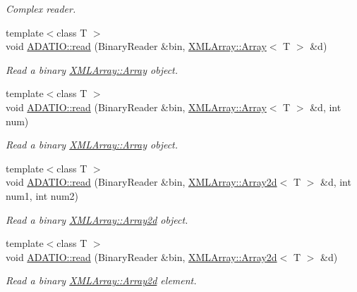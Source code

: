 \begin{DoxyCompactItemize}
\begin{DoxyCompactList}\small\item\em Complex reader. \end{DoxyCompactList}\item 
{\footnotesize template$<$class T $>$ }\\void \mbox{\hyperlink{namespaceADATIO_a16a912dec3b1d1424a44c9f1a6cd915f}{A\+D\+A\+T\+I\+O\+::read}} (Binary\+Reader \&bin, \mbox{\hyperlink{classXMLArray_1_1Array}{X\+M\+L\+Array\+::\+Array}}$<$ T $>$ \&d)
\begin{DoxyCompactList}\small\item\em Read a binary \mbox{\hyperlink{classXMLArray_1_1Array}{X\+M\+L\+Array\+::\+Array}} object. \end{DoxyCompactList}\item 
{\footnotesize template$<$class T $>$ }\\void \mbox{\hyperlink{namespaceADATIO_a2a2a1e3d909d72f5e64dcded1bdb8012}{A\+D\+A\+T\+I\+O\+::read}} (Binary\+Reader \&bin, \mbox{\hyperlink{classXMLArray_1_1Array}{X\+M\+L\+Array\+::\+Array}}$<$ T $>$ \&d, int num)
\begin{DoxyCompactList}\small\item\em Read a binary \mbox{\hyperlink{classXMLArray_1_1Array}{X\+M\+L\+Array\+::\+Array}} object. \end{DoxyCompactList}\item 
{\footnotesize template$<$class T $>$ }\\void \mbox{\hyperlink{namespaceADATIO_ab767ead2d172e8ecf85663edea909002}{A\+D\+A\+T\+I\+O\+::read}} (Binary\+Reader \&bin, \mbox{\hyperlink{classXMLArray_1_1Array2d}{X\+M\+L\+Array\+::\+Array2d}}$<$ T $>$ \&d, int num1, int num2)
\begin{DoxyCompactList}\small\item\em Read a binary \mbox{\hyperlink{classXMLArray_1_1Array2d}{X\+M\+L\+Array\+::\+Array2d}} object. \end{DoxyCompactList}\item 
{\footnotesize template$<$class T $>$ }\\void \mbox{\hyperlink{namespaceADATIO_a9a2262a21e8dd6377d669f96ef9276b9}{A\+D\+A\+T\+I\+O\+::read}} (Binary\+Reader \&bin, \mbox{\hyperlink{classXMLArray_1_1Array2d}{X\+M\+L\+Array\+::\+Array2d}}$<$ T $>$ \&d)
\begin{DoxyCompactList}\small\item\em Read a binary \mbox{\hyperlink{classXMLArray_1_1Array2d}{X\+M\+L\+Array\+::\+Array2d}} element. \end{DoxyCompactList}\item 

\end{DoxyCompactItemize}
